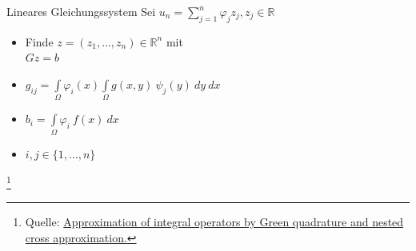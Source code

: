 \documentclass[10pt]{beamer}
\let\svthefootnote\thefootnote
\begin{document}
\begin{frame}{Lineares Gleichungssystem}
  Sei \(u_{n}  = \sum\limits_{j = 1}^{n} \varphi_{j} z_{j}, z_{j} \in
        \mathbb{R} \)
  \begin{itemize}
    \item Finde \(z = (z_{1}, \hdots, z_{n}) \in \mathbb{R}^{n}\) mit\\
          \(Gz = b\)
    \item \(g_{ij} = \int\limits_{\Omega} \varphi_{i}(x) \int\limits_{\Omega}
            g(x, y) \ \psi_{j}(y) \ dy \ dx\)
    \item \(b_{i} = \int\limits_{\Omega} \varphi_{i} \ f(x) \ dx\)
    \item \(i, j \in \{ 1, \hdots, n \}\)
  \end{itemize}
  \footnotesize
  \let\thefootnote\relax\footnote{Quelle: \href{https://link.springer.com/article/10.1007\%2Fs00211-015-0757-y}{Approximation of integral operators by Green quadrature and nested cross approximation.}}
  \addtocounter{footnote}{-1}\let\thefootnote\svthefootnote\relax
  \normalsize
\end{frame}
\end{document}
